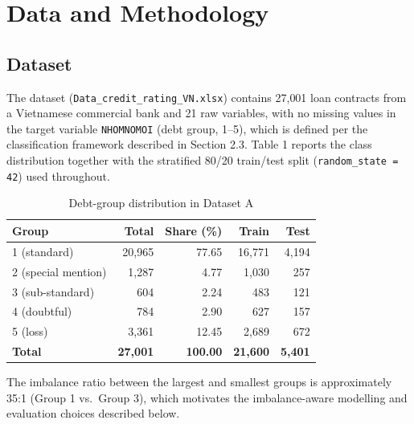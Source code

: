 \documentclass[11pt,a4paper]{article}
\begin{document}
\section{Data and Methodology}

\subsection{Dataset}

The dataset (\texttt{Data\_credit\_rating\_VN.xlsx}) contains 27{,}001 loan contracts from a Vietnamese commercial bank and 21 raw variables, with no missing values in the target variable \texttt{NHOMNOMOI} (debt group, 1--5), which is defined per the classification framework described in Section 2.3. Table 1 reports the class distribution together with the stratified 80/20 train/test split (\texttt{random\_state = 42}) used throughout.

\begin{table}[H]
\centering
\caption{Debt-group distribution in Dataset A}
\begin{tabular}{lrrrr}
\toprule
Group & Total & Share (\%) & Train & Test \\
\midrule
1 (standard)        & 20,965 & 77.65  & 16,771 & 4,194 \\
2 (special mention)  & 1,287  & 4.77   & 1,030  & 257 \\
3 (sub-standard)     & 604    & 2.24   & 483    & 121 \\
4 (doubtful)         & 784    & 2.90   & 627    & 157 \\
5 (loss)             & 3,361  & 12.45  & 2,689  & 672 \\
\midrule
\textbf{Total} & \textbf{27,001} & \textbf{100.00} & \textbf{21,600} & \textbf{5,401} \\
\bottomrule
\end{tabular}
\end{table}

The imbalance ratio between the largest and smallest groups is approximately 35:1 (Group 1 vs.\ Group 3), which motivates the imbalance-aware modelling and evaluation choices described below.
\end{document}
